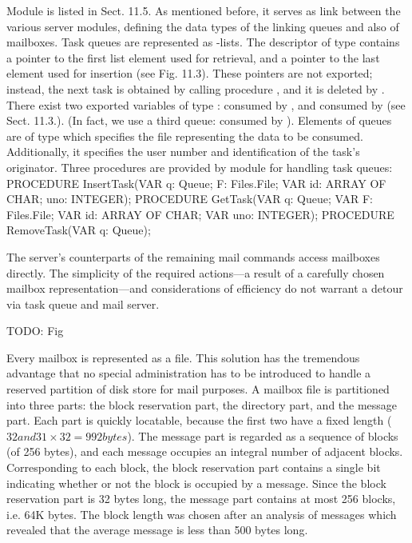 Module  is listed in Sect. 11.5. As mentioned before, it serves as link between the various server modules, defining the data types of the linking queues and also of mailboxes. Task queues are represented as -lists. The descriptor of type  contains a pointer to the first list element used for retrieval, and a pointer to the last element used for insertion (see Fig. 11.3). These pointers are not exported; instead, the next task is obtained by calling procedure , and it is deleted by . There exist two exported variables of type :  consumed by , and  consumed by  (see Sect. 11.3.). (In fact, we use a third queue:  consumed by ). Elements of queues are of type  which specifies the file representing the data to be consumed. Additionally, it specifies the user number and identification of the task's originator. Three procedures are provided by module  for handling task queues:
\begintt
PROCEDURE InsertTask(VAR q: Queue; F: Files.File; VAR id: ARRAY OF CHAR; uno: INTEGER);
PROCEDURE GetTask(VAR q: Queue; VAR F: Files.File; VAR id: ARRAY OF CHAR; VAR uno: INTEGER);
PROCEDURE RemoveTask(VAR q: Queue);
\endtt

\noindent The server's counterparts of the remaining mail commands access mailboxes directly. The simplicity of the required actions---a result of a carefully chosen mailbox representation---and considerations of efficiency do not warrant a detour via task queue and mail server.

TODO: Fig

Every mailbox is represented as a file. This solution has the tremendous advantage that no special administration has to be introduced to handle a reserved partition of disk store for mail purposes. A mailbox file is partitioned into three parts: the block reservation part, the directory part, and the message part. Each part is quickly locatable, because the first two have a fixed length ($32 and 31 \times 32 = 992 bytes$). The message part is regarded as a sequence of blocks (of 256 bytes), and each message occupies an integral number of adjacent blocks. Corresponding to each block, the block reservation part contains a single bit indicating whether or not the block is occupied by a message. Since the block reservation part is 32 bytes long, the message part contains at most 256 blocks, i.e. 64K bytes. The block length was chosen after an analysis of messages which revealed that the average message is less than 500 bytes long.

